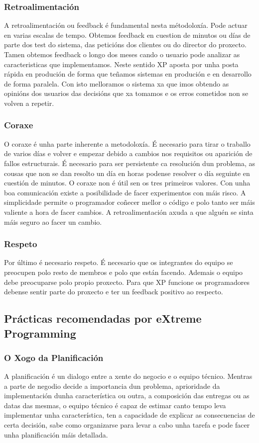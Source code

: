 \subsubsection{Retroalimentación}
A retroalimentación ou feedback é fundamental nesta métodoloxía. Pode actuar en varias escalas de tempo. Obtemos feedback en cuestion de minutos ou días de parte dos test do sistema, das peticións dos clientes ou do director do proxecto. Tamen obtemos feedback o longo dos meses cando o usuario pode analizar as caracteristicas que implementamos. Neste sentido XP aposta por unha posta rápida en produción de forma que teñamos sistemas en produción e en desarrollo de forma paralela. Con isto melloramos o sistema xa que imos obtendo as opinións dos usuarios das decisións que xa tomamos e os erros cometidos non se volven a repetir.

\subsubsection{Coraxe}
O coraxe é unha parte inherente a metodoloxía. É necesario para tirar o traballo de varios días e volver e empezar debido a cambios nos requisitos ou aparición de fallos estructurais. É necesario para ser persistente ca resolución dun problema, as cousas que non se dan resolto un día en horas podense resolver o día seguinte en cuestión de minutos. O coraxe non é útil sen os tres primeiros valores. Con unha boa comunicación existe a posibilidade de facer experimentos con máis risco. A simplicidade permite o programador coñecer mellor o código e polo tanto ser máis valiente a hora de facer cambios. A retroalimentación axuda a que alguén se sinta máis seguro ao facer un cambio.

\subsubsection{Respeto}
Por último é necesario respeto. É necesario que os integrantes do equipo se preocupen polo resto de membros e polo que están facendo. Ademais o equipo debe preocuparse polo propio proxecto. Para que XP funcione os programadores debense sentir parte do proxecto e ter un feedback positivo ao respecto.

\subsection{Prácticas recomendadas por eXtreme Programming}

\subsubsection{O Xogo da Planificación}
A planificación é un dialogo entre a xente do negocio e o equipo técnico. Mentras a parte de negodio decide a importancia dun problema, aprioridade da implementación dunha característica ou outra, a composición das entregas ou as datas das mesmas, o equipo técnico é capaz de estimar canto tempo leva implementar unha característica, ten a capacidade de explicar as consecuencias de certa decisión, sabe como organizarse para levar a cabo unha tarefa e pode facer unha planificación máis detallada.

